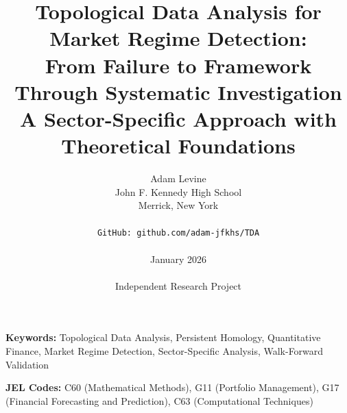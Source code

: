 \documentclass[12pt,letterpaper]{article}
\title{
\textbf{Topological Data Analysis for Market Regime Detection:\\
From Failure to Framework Through Systematic Investigation}\\
\vspace{0.3cm}
\large A Sector-Specific Approach with Theoretical Foundations
}
\author{
Adam Levine\\
John F. Kennedy High School\\
Merrick, New York\\
\\
\texttt{GitHub: github.com/adam-jfkhs/TDA}\\
\\
January 2026\\
\\
Independent Research Project
}
\date{}
\begin{document}

\maketitle
\thispagestyle{empty}

\vspace{0.3in}

\noindent\textbf{Keywords:} Topological Data Analysis, Persistent Homology, Quantitative Finance, Market Regime Detection, Sector-Specific Analysis, Walk-Forward Validation

\vspace{0.1in}

\noindent\textbf{JEL Codes:} C60 (Mathematical Methods), G11 (Portfolio Management), G17 (Financial Forecasting and Prediction), C63 (Computational Techniques)

\clearpage

\end{document}
